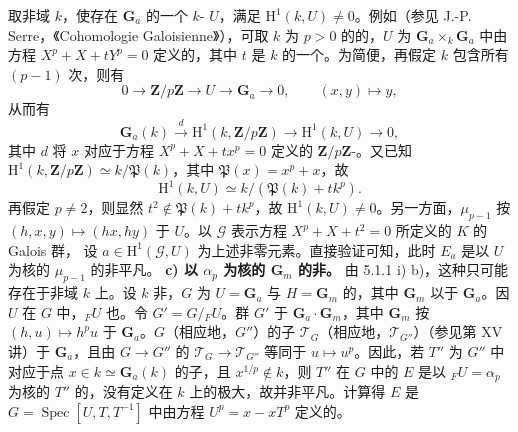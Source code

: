 取非域 $k$，使存在 $\mathbf G_a$ 的一个 $k$- $U$，满足 $\mathrm H^1(k,U)\ne0$。例如（参见 J.-P. Serre，《Cohomologie Galoisienne》），可取 $k$ 为 $p>0$ 的的，$U$ 为 $\mathbf G_a\times_k\mathbf G_a$ 中由方程 $X^p+X+tY^p=0$ 定义的，其中 $t$ 是 $k$ 的一个。为简便，再假定 $k$ 包含所有 $(p-1)$ 次，则有
\[0\longrightarrow\mathbf Z/p\mathbf Z\longrightarrow U\longrightarrow\mathbf G_a\longrightarrow0,
\qquad(x,y)\longmapsto y,\]
从而有
\[\mathbf G_a(k)\xrightarrow d\mathrm H^1(k,\mathbf Z/p\mathbf Z)\longrightarrow\mathrm H^1(k,U)\longrightarrow0,\]
其中 $d$ 将 $x$ 对应于方程 $X^p+X+tx^p=0$ 定义的 $\mathbf Z/p\mathbf Z$-。又已知 $\mathrm H^1(k,\mathbf Z/p\mathbf Z)\simeq k/\mathfrak P(k)$，其中 $\mathfrak P(x)=x^p+x$，故
\[\mathrm H^1(k,U)\simeq k/(\mathfrak P(k)+tk^p).\]
再假定 $p\ne2$，则显然 $t^2\notin\mathfrak P(k)+tk^p$，故 $\mathrm H^1(k,U)\ne0$。另一方面，$\mu_{p-1}$ 按 $(h,x,y)\mapsto(hx,hy)$ 于 $U$。以 $\mathscr G$ 表示方程 $X^p+X+t^2=0$ 所定义的 $K$ 的 Galois 群，
设 $a\in\mathrm H^1(\mathscr G,U)$ 为上述非零元素。直接验证可知，此时 $E_a$ 是以 $U$ 为核的 $\mu_{p-1}$ 的非平凡。
\textbf{c) 以 $\alpha_p$ 为核的 $\mathbf G_m$ 的非。}
由 5.1.1 i) b)，这种只可能存在于非域 $k$ 上。设 $k$ 非，$G$ 为 $U=\mathbf G_a$ 与 $H=\mathbf G_m$ 的，其中 $\mathbf G_m$ 以于 $\mathbf G_a$。因 $U$ 在 $G$ 中，${}_FU$ 也。令 $G'=G/{}_FU$。群 $G'$ 于 $\mathbf G_a\cdot\mathbf G_m$，其中 $\mathbf G_m$ 按 $(h,u)\mapsto h^pu$ 于 $\mathbf G_a$。$G$（相应地，$G''$）的子 $\mathscr T_G$（相应地，$\mathscr T_{G''}$）（参见第 XV 讲）于 $\mathbf G_a$，且由 $G\to G''$ 的 $\mathscr T_G\to\mathscr T_{G''}$ 等同于 $u\mapsto u^p$。因此，若 $T''$ 为 $G''$ 中对应于点 $x\in k\simeq\mathbf G_a(k)$ 的子，且 $x^{1/p}\notin k$，则 $T''$ 在 $G$ 中的 $E$ 是以 ${}_FU=\alpha_p$ 为核的 $T''$ 的，没有定义在 $k$ 上的极大，故并非平凡。计算得 $E$ 是 $G=\operatorname{Spec}[U,T,T^{-1}]$ 中由方程 $U^p=x-xT^p$ 定义的。
